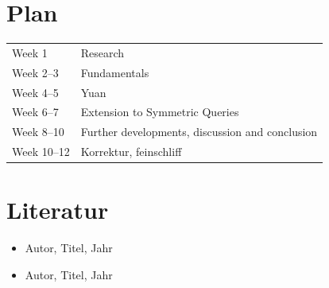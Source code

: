 \documentclass{article}
\begin{document}
\section{Plan}
\begin{tabular}{ll}
Week 1 & Research \\
Week 2--3 & Fundamentals \\
Week 4--5 & Yuan \\
Week 6--7 & Extension to Symmetric Queries \\
Week 8--10 & Further developments, discussion and conclusion \\
Week 10--12 & Korrektur, feinschliff \\
\end{tabular}

\section{Literatur}
\begin{itemize}
    \item Autor, Titel, Jahr
    \item Autor, Titel, Jahr
\end{itemize}
\end{document}
